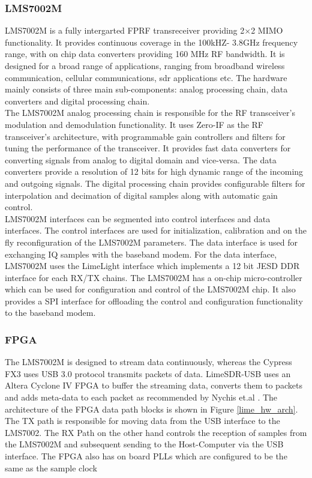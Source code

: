\subsubsection{LMS7002M} 

LMS7002M is a fully intergarted \ac{FPRF} transreceiver providing 2$\times$2 \ac{MIMO} functionality.
It provides continuous coverage in the 100kHZ- 3.8GHz frequency range, with on chip data converters providing 160 MHz \ac{RF} bandwidth.
It is designed for a broad range of applications, ranging from broadband wireless communication, cellular communications, \ac{sdr} applications etc.
The hardware mainly consists of three main sub-components: analog processing chain, data converters and digital processing chain.\\


The LMS7002M analog processing chain is responsible for the \ac{RF} transceiver's modulation and demodulation functionality.
It uses Zero-IF as the RF transceiver's architecture, with programmable gain controllers and filters for tuning the performance of the transceiver.
It provides fast data converters for converting signals from analog to digital domain and vice-versa.
The data converters provide a resolution of 12 bits for high dynamic range of the incoming and outgoing signals.
The digital processing chain provides configurable filters for interpolation and decimation of digital samples along with automatic gain control.\\

LMS7002M interfaces can be segmented into control interfaces and data interfaces.
The control interfaces are used for initialization, calibration and on the fly reconfiguration of the LMS7002M parameters.
The data interface is used for exchanging \ac{IQ} samples with the baseband modem.
For the data interface, LMS7002M uses the LimeLight interface which implements a 12 bit JESD \ac{DDR} interface for each RX/TX chains.
The LMS7002M has a on-chip micro-controller which can be used for configuration and control of the LMS7002M chip.
It also provides a \ac{SPI} interface for offloading the control and configuration functionality to the baseband modem.\\

\subsubsection{FPGA}

The LMS7002M is designed to stream data continuously, whereas the Cypress FX3 uses USB 3.0 protocol transmits packets of data.
LimeSDR-USB uses an Altera Cyclone IV \ac{FPGA} to buffer the streaming data, converts them to packets and adds meta-data to each packet as recommended by Nychis et.al \cite{nychis_enabling_nodate}.
The architecture of the FPGA data path blocks is shown in Figure \ref{lime_hw_arch}.
The TX path is responsible for moving data from the USB interface to the LMS7002.
The RX Path on the other hand controls the reception of samples from the LMS7002M and subsequent sending to the Host-Computer via the USB interface.
The \ac{FPGA} also has on board PLLs which are configured to be the same as the sample clock\\


